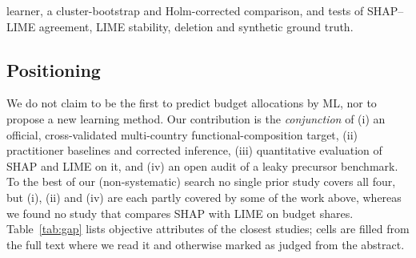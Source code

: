 learner, a cluster-bootstrap and Holm-corrected comparison, and tests of SHAP--LIME agreement, LIME stability, deletion and synthetic ground truth.

\subsection{Positioning}
We do not claim to be the first to predict budget allocations by ML, nor to propose a new learning method. Our contribution is the \emph{conjunction} of (i) an official, cross-validated multi-country functional-composition target, (ii) practitioner baselines and corrected inference, (iii) quantitative evaluation of SHAP and LIME on it, and (iv) an open audit of a leaky precursor benchmark. To the best of our (non-systematic) search no single prior study covers all four, but (i), (ii) and (iv) are each partly covered by some of the work above, whereas we found no study that compares SHAP with LIME on budget shares. Table~\ref{tab:gap} lists objective attributes of the closest studies; cells are filled from the full text where we read it and otherwise marked as judged from the abstract.
